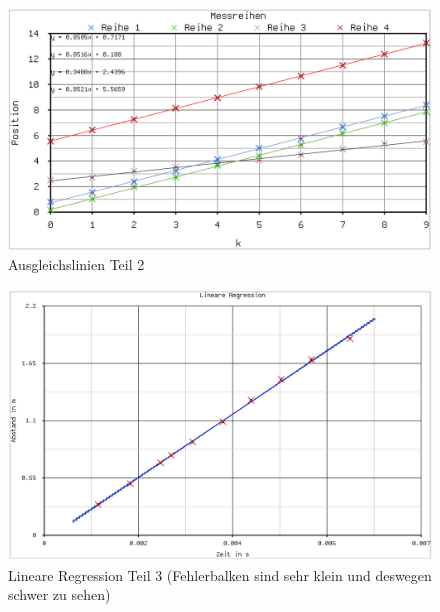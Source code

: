 \documentclass[11pt,a4paper]{article}
\begin{document}
\begin{figure}
\centering
\includegraphics[width=\textwidth]{rect}
\caption{Ausgleichslinien Teil 2}
\label{uppy}
\end{figure}

\begin{figure}
\centering
\includegraphics[width=\textwidth]{recd}
\caption{Lineare Regression Teil 3 (Fehlerbalken sind sehr klein und deswegen schwer zu sehen)}
\label{durp}
\end{figure}
\end{document}
